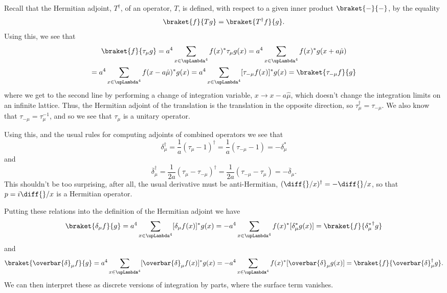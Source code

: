 \documentclass[fleqn]{NotesClass}
\newcommand{\hermit}{\dagger}
\newcommand{\lattice}[1][4]{\upLambda^{#1}}
\newcommand{\forwardDerivative}{\delta}
\newcommand{\backwardDerivative}{\delta^*}
\newcommand{\centralDerivative}{\overbar{\delta}}
\begin{document}
    Recall that the Hermitian adjoint, \(T^{\hermit}\),  of an operator, \(T\), is defined, with respect to a given inner product \(\braket{-}{-}\), by the equality
    \begin{equation}
        \braket{f}{Tg} = \braket{T^\hermit f}{g}.
    \end{equation}
    Using this, we see that
    \begin{multline}
        \braket{f}{\tau_\mu g} = a^4 \sum_{x\in\lattice} f(x)^*\tau_\mu g(x) = a^4 \sum_{x\in\lattice} f(x)^*g(x + a\hat{\mu})\\
        = a^4\sum_{x\in\lattice} f(x - a\hat{\mu})^* g(x) = a^4\sum_{x\in\lattice} [\tau_{-\mu}f(x)]^*g(x) = \braket{\tau_{-\mu}f}{g}
    \end{multline}
    where we get to the second line by performing a change of integration variable, \(x \to x - a\hat{\mu}\), which doesn't change the integration limits on an infinite lattice.
    Thus, the Hermitian adjoint of the translation is the translation in the opposite direction, so \(\tau_\mu^\hermit = \tau_{-\mu}\).
    We also know that \(\tau_{-\mu} = \tau_{\mu}^{-1}\), and so we see that \(\tau_\mu\) is a unitary operator.
    
    Using this, and the usual rules for computing adjoints of combined operators we see that
    \begin{equation}
        \forwardDerivative_\mu^\hermit = \frac{1}{a}(\tau_\mu - 1)^\hermit = \frac{1}{a}(\tau_{-\mu} - 1) = -\backwardDerivative_\mu
    \end{equation}
    and
    \begin{equation}
        \centralDerivative_\mu^\hermit = \frac{1}{2a}(\tau_\mu - \tau_{-\mu})^\hermit = \frac{1}{2a}(\tau_{-\mu} - \tau_\mu) = -\centralDerivative_\mu.
    \end{equation}
    This shouldn't be too surprising, after all, the usual derivative must be anti-Hermitian, \((\diff{}/{x})^\hermit = -\diff{}/{x}\), so that \(p = i\diff{}/{x}\) is a Hermitian operator.
    
    Putting these relations into the definition of the Hermitian adjoint we have
    \begin{equation}
        \braket{\forwardDerivative_\mu f}{g} = a^4 \sum_{x\in\lattice} [\forwardDerivative_\mu f(x)]^*g(x) = -a^4 \sum_{x\in\lattice} f(x)^*[\backwardDerivative_\mu g(x)] = \braket{f}{{\backwardDerivative_\mu}^\hermit g}
    \end{equation}
    and
    \begin{equation}
        \braket{\centralDerivative_\mu f}{g} = a^4 \sum_{x\in\lattice} [\centralDerivative_\mu f(x)]^* g(x) = -a^4 \sum_{x\in\lattice} f(x)^*[\centralDerivative_\mu g(x)] = \braket{f}{\centralDerivative_\mu^\hermit g}.
    \end{equation}
    We can then interpret these as discrete versions of integration by parts, where the surface term vanishes.
    
\end{document}
